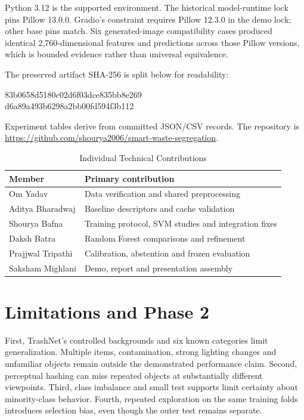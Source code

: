 \documentclass[conference]{IEEEtran}
\begin{document}
Python 3.12 is the supported environment. The historical model-runtime lock pins Pillow 13.0.0. Gradio's constraint requires Pillow 12.3.0 in the demo lock; other base pins match. Six generated-image compatibility cases produced identical 2,760-dimensional features and predictions across those Pillow versions, which is bounded evidence rather than universal equivalence.

The preserved artifact SHA-256 is split below for readability:
\begin{center}\footnotesize\ttfamily
83b0658d5180c02d6f03dce835bb8e269\\
d6a89a493b6298a2bb00fd594f3b112
\end{center}
Experiment tables derive from committed JSON/CSV records. The repository is
\url{https://github.com/shourya2006/smart-waste-segregation}.

\begin{table}[t]\caption{Individual Technical Contributions}\centering
\begin{tabular}{lp{5cm}}\toprule
Member & Primary contribution\\\midrule
Om Yadav & Data verification and shared preprocessing\\
Aditya Bharadwaj & Baseline descriptors and cache validation\\
Shourya Bafna & Training protocol, SVM studies and integration fixes\\
Daksh Batra & Random Forest comparisons and refinement\\
Prajjwal Tripathi & Calibration, abstention and frozen evaluation\\
Saksham Mighlani & Demo, report and presentation assembly\\\bottomrule
\end{tabular}\end{table}

\section{Limitations and Phase 2}
First, TrashNet's controlled backgrounds and six known categories limit generalization. Multiple items, contamination, strong lighting changes and unfamiliar objects remain outside the demonstrated performance claim. Second, perceptual hashing can miss repeated objects at substantially different viewpoints. Third, class imbalance and small test supports limit certainty about minority-class behavior. Fourth, repeated exploration on the same training folds introduces selection bias, even though the outer test remains separate.
\end{document}
